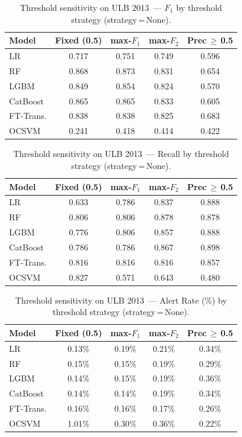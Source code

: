 \begin{table}[ht!]
\centering
\caption{Threshold sensitivity on ULB 2013~--- $F_1$ by threshold strategy (strategy\,=\,None).}
\label{tab:threshold_ulb_f1}
\begin{tabular}{l c c c c}
\toprule
Model & Fixed (0.5) & max-$F_1$ & max-$F_2$ & Prec\,$\geq$\,0.5 \\
\midrule
LR         & 0.717 & 0.751 & 0.749 & 0.596 \\
RF         & 0.868 & 0.873 & 0.831 & 0.654 \\
LGBM       & 0.849 & 0.854 & 0.824 & 0.570 \\
CatBoost   & 0.865 & 0.865 & 0.833 & 0.605 \\
FT-Trans.  & 0.838 & 0.838 & 0.825 & 0.683 \\
OCSVM      & 0.241 & 0.418 & 0.414 & 0.422 \\
\bottomrule
\end{tabular}
\end{table}

\begin{table}[ht!]
\centering
\caption{Threshold sensitivity on ULB 2013~--- Recall by threshold strategy (strategy\,=\,None).}
\label{tab:threshold_ulb_recall}
\begin{tabular}{l c c c c}
\toprule
Model & Fixed (0.5) & max-$F_1$ & max-$F_2$ & Prec\,$\geq$\,0.5 \\
\midrule
LR         & 0.633 & 0.786 & 0.837 & 0.888 \\
RF         & 0.806 & 0.806 & 0.878 & 0.878 \\
LGBM       & 0.776 & 0.806 & 0.857 & 0.888 \\
CatBoost   & 0.786 & 0.786 & 0.867 & 0.898 \\
FT-Trans.  & 0.816 & 0.816 & 0.816 & 0.857 \\
OCSVM      & 0.827 & 0.571 & 0.643 & 0.480 \\
\bottomrule
\end{tabular}
\end{table}

\begin{table}[ht!]
\centering
\caption{Threshold sensitivity on ULB 2013~--- Alert Rate (\%) by threshold strategy (strategy\,=\,None).}
\label{tab:threshold_ulb_alert}
\begin{tabular}{l c c c c}
\toprule
Model & Fixed (0.5) & max-$F_1$ & max-$F_2$ & Prec\,$\geq$\,0.5 \\
\midrule
LR         & 0.13\% & 0.19\% & 0.21\% & 0.34\% \\
RF         & 0.15\% & 0.15\% & 0.19\% & 0.29\% \\
LGBM       & 0.14\% & 0.15\% & 0.19\% & 0.36\% \\
CatBoost   & 0.14\% & 0.14\% & 0.19\% & 0.34\% \\
FT-Trans.  & 0.16\% & 0.16\% & 0.17\% & 0.26\% \\
OCSVM      & 1.01\% & 0.30\% & 0.36\% & 0.22\% \\
\bottomrule
\end{tabular}
\end{table}

